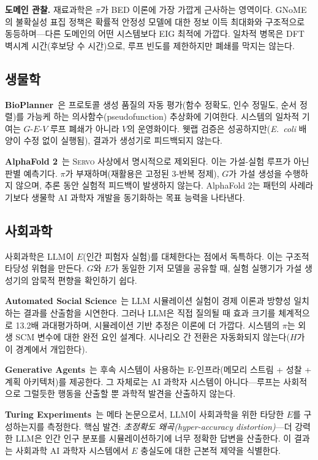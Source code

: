 \documentclass[11pt]{article}
\newcommand{\framework}{\textsc{Servo}}
\begin{document}
\textbf{도메인 관찰.} 재료과학은 $\pi$가 BED 이론에 가장 가깝게 근사하는 영역이다. GNoME의 불확실성 표집 정책은 확률적 안정성 모델에 대한 정보 이득 최대화와 구조적으로 동등하며---다른 도메인의 어떤 시스템보다 EIG 최적에 가깝다. 일차적 병목은 DFT 벽시계 시간(후보당 수 시간)으로, 루프 빈도를 제한하지만 폐쇄를 막지는 않는다.

\subsection{생물학}

\textbf{BioPlanner}~\citep{odonoghue2023bioplanner}은 프로토콜 생성 품질의 자동 평가(함수 정확도, 인수 정밀도, 순서 정렬)를 가능케 하는 의사함수(pseudofunction) 추상화에 기여한다. 시스템의 일차적 기여는 $G$-$E$-$V$ 루프 폐쇄가 아니라 $V$의 운영화이다. 웻랩 검증은 성공하지만(\textit{E.\ coli} 배양이 수정 없이 실행됨), 결과가 생성기로 피드백되지 않는다.

\textbf{AlphaFold 2}~\citep{jumper2021alphafold}는 \framework{} 사상에서 명시적으로 제외된다. 이는 가설-실험 루프가 아닌 판별 예측기다. $\pi$가 부재하며(재활용은 고정된 3-반복 정제), $G$가 가설 생성을 수행하지 않으며, 추론 동안 실험적 피드백이 발생하지 않는다. AlphaFold 2는 패턴의 사례라기보다 생물학 AI 과학자 개발을 동기화하는 목표 능력을 나타낸다.

\subsection{사회과학}

사회과학은 LLM이 $E$(인간 피험자 실험)를 대체한다는 점에서 독특하다. 이는 구조적 타당성 위협을 만든다. $G$와 $E$가 동일한 기저 모델을 공유할 때, 실험 실행기가 가설 생성기의 암묵적 편향을 확인하기 쉽다.

\textbf{Automated Social Science}~\citep{manning2024automated}는 LLM 시뮬레이션 실험이 경제 이론과 방향성 일치하는 결과를 산출함을 시연한다. 그러나 LLM은 직접 질의될 때 효과 크기를 체계적으로 13.2배 과대평가하며, 시뮬레이션 기반 추정은 이론에 더 가깝다. 시스템의 $\pi$는 외생 SCM 변수에 대한 완전 요인 설계다. 시나리오 간 전환은 자동화되지 않는다($H$가 이 경계에서 개입한다).

\textbf{Generative Agents}~\citep{park2023generative}는 후속 시스템이 사용하는 E-인프라(메모리 스트림 + 성찰 + 계획 아키텍처)를 제공한다. 그 자체로는 AI 과학자 시스템이 아니다---루프는 사회적으로 그럴듯한 행동을 산출할 뿐 과학적 발견을 산출하지 않는다.

\textbf{Turing Experiments}~\citep{aher2023turing}는 메타 논문으로서, LLM이 사회과학을 위한 타당한 $E$를 구성하는지를 측정한다. 핵심 발견: \emph{초정확도 왜곡(hyper-accuracy distortion)}---더 강력한 LLM은 인간 인구 분포를 시뮬레이션하기에 너무 정확한 답변을 산출한다. 이 결과는 사회과학 AI 과학자 시스템에서 $E$ 충실도에 대한 근본적 제약을 식별한다.
\end{document}
